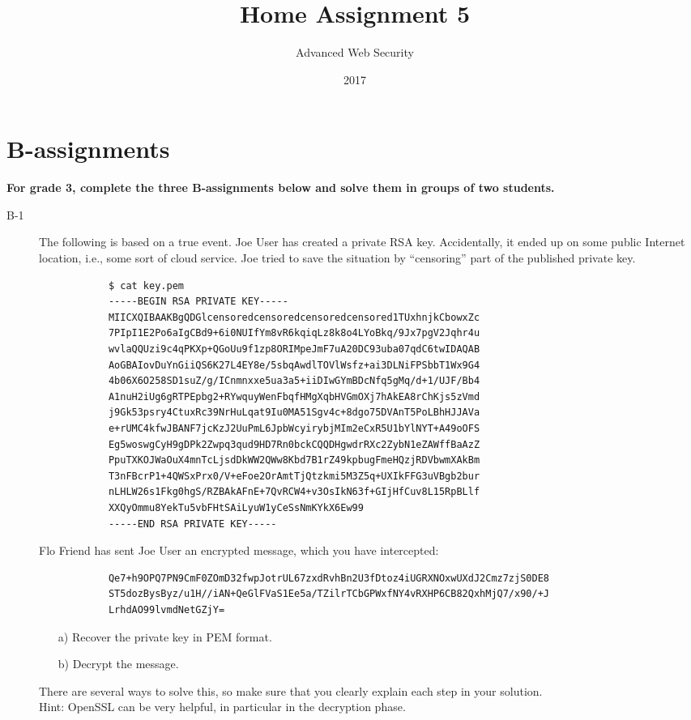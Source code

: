 \documentclass{article}
\begin{document}
	
	\title{Home Assignment 5}
	\author{Advanced Web Security}
	\date{2017}
	
	\maketitle
	
	\section*{B-assignments}
	\textbf{For grade 3, complete the three B-assignments below and solve them in groups of two students.}
	
	\begin{description}
		
		\item[B-1]{The following is based on a true event. Joe User has created a private RSA key. Accidentally, it ended up on some public Internet location, i.e., some sort of cloud service. Joe tried to save the situation by ``censoring'' part of the published private key.
			\begin{verbatim}
			$ cat key.pem
			-----BEGIN RSA PRIVATE KEY-----
			MIICXQIBAAKBgQDGlcensoredcensoredcensoredcensored1TUxhnjkCbowxZc
			7PIpI1E2Po6aIgCBd9+6i0NUIfYm8vR6kqiqLz8k8o4LYoBkq/9Jx7pgV2Jqhr4u
			wvlaQQUzi9c4qPKXp+QGoUu9f1zp8ORIMpeJmF7uA20DC93uba07qdC6twIDAQAB
			AoGBAIovDuYnGiiQS6K27L4EY8e/5sbqAwdlTOVlWsfz+ai3DLNiFPSbbT1Wx9G4
			4b06X6O258SD1suZ/g/ICnmnxxe5ua3a5+iiDIwGYmBDcNfq5gMq/d+1/UJF/Bb4
			A1nuH2iUg6gRTPEpbg2+RYwquyWenFbqfHMgXqbHVGmOXj7hAkEA8rChKjs5zVmd
			j9Gk53psry4CtuxRc39NrHuLqat9Iu0MA51Sgv4c+8dgo75DVAnT5PoLBhHJJAVa
			e+rUMC4kfwJBANF7jcKzJ2UuPmL6JpbWcyirybjMIm2eCxR5U1bYlNYT+A49oOFS
			Eg5woswgCyH9gDPk2Zwpq3qud9HD7Rn0bckCQQDHgwdrRXc2ZybN1eZAWffBaAzZ
			PpuTXKOJWaOuX4mnTcLjsdDkWW2QWw8Kbd7B1rZ49kpbugFmeHQzjRDVbwmXAkBm
			T3nFBcrP1+4QWSxPrx0/V+eFoe2OrAmtTjQtzkmi5M3Z5q+UXIkFFG3uVBgb2bur
			nLHLW26s1Fkg0hgS/RZBAkAFnE+7QvRCW4+v3OsIkN63f+GIjHfCuv8L15RpBLlf
			XXQyOmmu8YekTu5vbFHtSAiLyuW1yCeSsNmKYkX6Ew99
			-----END RSA PRIVATE KEY-----
			\end{verbatim}
			
			Flo Friend has sent Joe User an encrypted message,
			which you have intercepted:
			\begin{verbatim}
			Qe7+h9OPQ7PN9CmF0ZOmD32fwpJotrUL67zxdRvhBn2U3fDtoz4iUGRXNOxwUXdJ2Cmz7zjS0DE8
			ST5dozBysByz/u1H//iAN+QeGlFVaS1Ee5a/TZilrTCbGPWxfNY4vRXHP6CB82QxhMjQ7/x90/+J
			LrhdAO99lvmdNetGZjY=
			\end{verbatim}
			\begin{itemize}
				\item[a)] Recover the private key in PEM format.
				\item[b)] Decrypt the message.
			\end{itemize}
			There are several ways to solve this, so make sure that you clearly explain each step in your solution.\\
			Hint: OpenSSL can be very helpful, in particular in the decryption phase.\\
			
}
\end{description}
\end{document}
